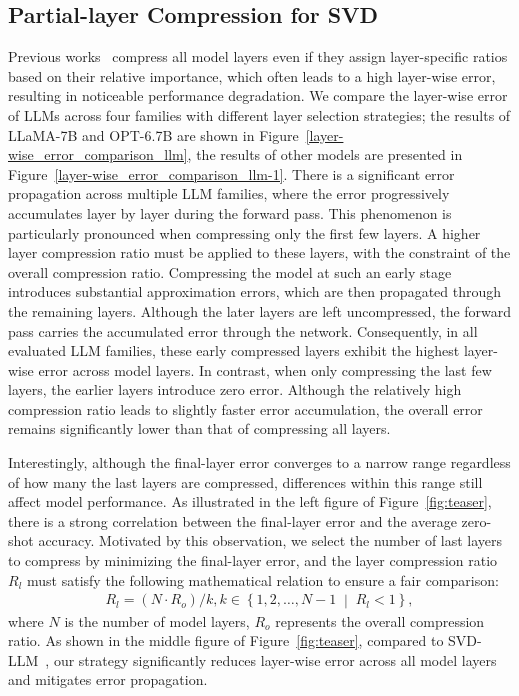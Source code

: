 \subsection{Partial-layer Compression for SVD} \label{sec_plc}
Previous works~\cite{yuan2023asvd,wang2024svd,wang2024basis,li2025adasvd} compress all model layers even if they assign layer-specific ratios based on their relative importance, which often leads to a high layer-wise error, resulting in noticeable performance degradation. We compare the layer-wise error of LLMs across four families with different layer selection strategies; the results of LLaMA-7B and OPT-6.7B are shown in Figure~\ref{layer-wise_error_comparison_llm}, the results of other models are presented in Figure~\ref{layer-wise_error_comparison_llm-1}. There is a significant error propagation across multiple LLM families, where the error progressively accumulates layer by layer during the forward pass. 
This phenomenon is particularly pronounced when compressing only the first few layers. 
A higher layer compression ratio must be applied to these layers, with the constraint of the overall compression ratio.
Compressing the model at such an early stage introduces substantial approximation errors, which are then propagated through the remaining layers.
Although the later layers are left uncompressed, the forward pass carries the accumulated error through the network. Consequently, in all evaluated LLM families, these early compressed layers exhibit the highest layer-wise error across model layers. 
In contrast, when only compressing the last few layers, the earlier layers introduce zero error. Although the relatively high compression ratio leads to slightly faster error accumulation, the overall error remains significantly lower than that of compressing all layers.

Interestingly, although the final-layer error converges to a narrow range regardless of how many the last layers are compressed, differences within this range still affect model performance. As illustrated in the left figure of Figure~\ref{fig:teaser}, there is a strong correlation between the final-layer error and the average zero-shot accuracy. Motivated by this observation, we select the number of last layers to compress by minimizing the final-layer error, and the layer compression ratio $R_l$ must satisfy the following mathematical relation to ensure a fair comparison:
\begin{align}
   R_l = (N \cdot R_o)/k, k \in \left\{ 1, 2, \dots, N-1 \;\middle|\; R_l< 1\right\},
\end{align} 
where $N$ is the number of model layers, $R_o$ represents the overall compression ratio.
As shown in the middle figure of Figure~\ref{fig:teaser}, compared to SVD-LLM~\cite{wang2024svd}, our strategy significantly reduces layer-wise error across all model layers and mitigates error propagation.

